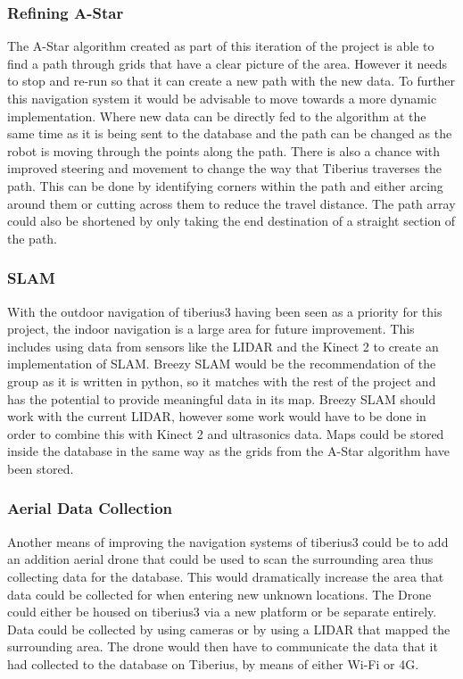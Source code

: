 \subsubsection{Refining A-Star}
The A-Star algorithm created as part of this iteration of the project is able to find a path through grids that have a clear picture of the area. However it needs to stop and re-run so that it can create a new path with the new data. To further this navigation system it would be advisable to move towards a more dynamic implementation. Where new data can be directly fed to the algorithm at the same time as it is being sent to the database and the path can be changed as the robot is moving through the points along the path.
There is also a chance with improved steering and movement to change the way that Tiberius traverses the path. This can be done by identifying corners within the path and either arcing around them or cutting across them to reduce the travel distance. The path array could also be shortened by only taking the end destination of a straight section of the path.
\subsubsection{\gls{SLAM}}
With the outdoor navigation of \gls{tiberius3} having been seen as a priority for this project, the indoor navigation is a large area for future improvement. This includes using data from sensors like the \gls{LIDAR} and the Kinect 2 to create an implementation of \gls{SLAM}. Breezy \gls{SLAM} would be the recommendation of the group as it is written in python, so it matches with the rest of the project and has the potential to provide meaningful data in its map. Breezy \gls{SLAM} should work with the current \gls{LIDAR}, however some work would have to be done in order to combine this with Kinect 2 and ultrasonics data. Maps could be stored inside the database in the same way as the grids from the A-Star algorithm have been stored.
\subsubsection{Aerial Data Collection}
Another means of improving the navigation systems of \gls{tiberius3} could be to add an addition aerial drone that could be used to scan the surrounding area thus collecting data for the database. This would dramatically increase the area that data could be collected for when entering new unknown locations. The Drone could either be housed on \gls{tiberius3} via a new platform or be separate entirely. Data could be collected by using cameras or by using a \gls{LIDAR} that mapped the surrounding area. The drone would then have to communicate the data that it had collected to the database on Tiberius, by means of either Wi-Fi or 4G. 


















